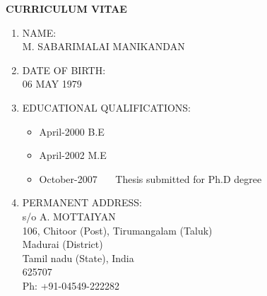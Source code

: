 \newpage
\begin{center}
{\Large\bf CURRICULUM VITAE}
\end{center}
\vspace{0.5cm}
\begin{enumerate}
    \item NAME:\\
          M. SABARIMALAI MANIKANDAN
    \item DATE OF BIRTH:\\
          06 MAY 1979
    \item EDUCATIONAL QUALIFICATIONS:
          \begin{itemize}
          \item April-2000 \quad \quad \quad B.E
          \item April-2002 \quad M.E
          \item October-2007 \,\,\,\,\,\,\,\,\,\qquad Thesis submitted for
          Ph.D degree
          \end{itemize}
    \item PERMANENT ADDRESS:\\
          s/o A. MOTTAIYAN\\
          106, Chitoor (Post), Tirumangalam (Taluk)\\
          Madurai (District)\\
          Tamil nadu (State), India\\
          625707\\
          Ph: +91-04549-222282
\end{enumerate}
